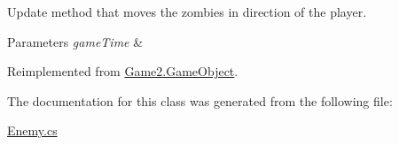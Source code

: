 Update method that moves the zombies in direction of the player. 


\begin{DoxyParams}{Parameters}
{\em game\+Time} & \\
\hline
\end{DoxyParams}


Reimplemented from \mbox{\hyperlink{class_game2_1_1_game_object_a360a294d8a55dcc747c44f8cc1aefe28}{Game2.\+Game\+Object}}.



The documentation for this class was generated from the following file\+:\begin{DoxyCompactItemize}
\item 
\mbox{\hyperlink{_enemy_8cs}{Enemy.\+cs}}\end{DoxyCompactItemize}

